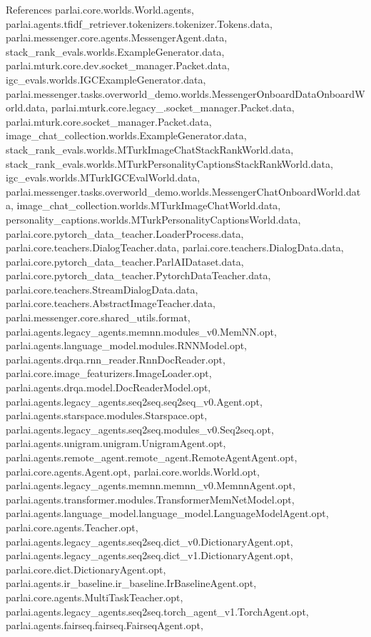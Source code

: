 References parlai.\+core.\+worlds.\+World.\+agents, parlai.\+agents.\+tfidf\+\_\+retriever.\+tokenizers.\+tokenizer.\+Tokens.\+data, parlai.\+messenger.\+core.\+agents.\+Messenger\+Agent.\+data, stack\+\_\+rank\+\_\+evals.\+worlds.\+Example\+Generator.\+data, parlai.\+mturk.\+core.\+dev.\+socket\+\_\+manager.\+Packet.\+data, igc\+\_\+evals.\+worlds.\+I\+G\+C\+Example\+Generator.\+data, parlai.\+messenger.\+tasks.\+overworld\+\_\+demo.\+worlds.\+Messenger\+Onboard\+Data\+Onboard\+World.\+data, parlai.\+mturk.\+core.\+legacy\+\_.\+socket\+\_\+manager.\+Packet.\+data, parlai.\+mturk.\+core.\+socket\+\_\+manager.\+Packet.\+data, image\+\_\+chat\+\_\+collection.\+worlds.\+Example\+Generator.\+data, stack\+\_\+rank\+\_\+evals.\+worlds.\+M\+Turk\+Image\+Chat\+Stack\+Rank\+World.\+data, stack\+\_\+rank\+\_\+evals.\+worlds.\+M\+Turk\+Personality\+Captions\+Stack\+Rank\+World.\+data, igc\+\_\+evals.\+worlds.\+M\+Turk\+I\+G\+C\+Eval\+World.\+data, parlai.\+messenger.\+tasks.\+overworld\+\_\+demo.\+worlds.\+Messenger\+Chat\+Onboard\+World.\+data, image\+\_\+chat\+\_\+collection.\+worlds.\+M\+Turk\+Image\+Chat\+World.\+data, personality\+\_\+captions.\+worlds.\+M\+Turk\+Personality\+Captions\+World.\+data, parlai.\+core.\+pytorch\+\_\+data\+\_\+teacher.\+Loader\+Process.\+data, parlai.\+core.\+teachers.\+Dialog\+Teacher.\+data, parlai.\+core.\+teachers.\+Dialog\+Data.\+data, parlai.\+core.\+pytorch\+\_\+data\+\_\+teacher.\+Parl\+A\+I\+Dataset.\+data, parlai.\+core.\+pytorch\+\_\+data\+\_\+teacher.\+Pytorch\+Data\+Teacher.\+data, parlai.\+core.\+teachers.\+Stream\+Dialog\+Data.\+data, parlai.\+core.\+teachers.\+Abstract\+Image\+Teacher.\+data, parlai.\+messenger.\+core.\+shared\+\_\+utils.\+format, parlai.\+agents.\+legacy\+\_\+agents.\+memnn.\+modules\+\_\+v0.\+Mem\+N\+N.\+opt, parlai.\+agents.\+language\+\_\+model.\+modules.\+R\+N\+N\+Model.\+opt, parlai.\+agents.\+drqa.\+rnn\+\_\+reader.\+Rnn\+Doc\+Reader.\+opt, parlai.\+core.\+image\+\_\+featurizers.\+Image\+Loader.\+opt, parlai.\+agents.\+drqa.\+model.\+Doc\+Reader\+Model.\+opt, parlai.\+agents.\+legacy\+\_\+agents.\+seq2seq.\+seq2seq\+\_\+v0.\+Agent.\+opt, parlai.\+agents.\+starspace.\+modules.\+Starspace.\+opt, parlai.\+agents.\+legacy\+\_\+agents.\+seq2seq.\+modules\+\_\+v0.\+Seq2seq.\+opt, parlai.\+agents.\+unigram.\+unigram.\+Unigram\+Agent.\+opt, parlai.\+agents.\+remote\+\_\+agent.\+remote\+\_\+agent.\+Remote\+Agent\+Agent.\+opt, parlai.\+core.\+agents.\+Agent.\+opt, parlai.\+core.\+worlds.\+World.\+opt, parlai.\+agents.\+legacy\+\_\+agents.\+memnn.\+memnn\+\_\+v0.\+Memnn\+Agent.\+opt, parlai.\+agents.\+transformer.\+modules.\+Transformer\+Mem\+Net\+Model.\+opt, parlai.\+agents.\+language\+\_\+model.\+language\+\_\+model.\+Language\+Model\+Agent.\+opt, parlai.\+core.\+agents.\+Teacher.\+opt, parlai.\+agents.\+legacy\+\_\+agents.\+seq2seq.\+dict\+\_\+v0.\+Dictionary\+Agent.\+opt, parlai.\+agents.\+legacy\+\_\+agents.\+seq2seq.\+dict\+\_\+v1.\+Dictionary\+Agent.\+opt, parlai.\+core.\+dict.\+Dictionary\+Agent.\+opt, parlai.\+agents.\+ir\+\_\+baseline.\+ir\+\_\+baseline.\+Ir\+Baseline\+Agent.\+opt, parlai.\+core.\+agents.\+Multi\+Task\+Teacher.\+opt, parlai.\+agents.\+legacy\+\_\+agents.\+seq2seq.\+torch\+\_\+agent\+\_\+v1.\+Torch\+Agent.\+opt, parlai.\+agents.\+fairseq.\+fairseq.\+Fairseq\+Agent.\+opt, 